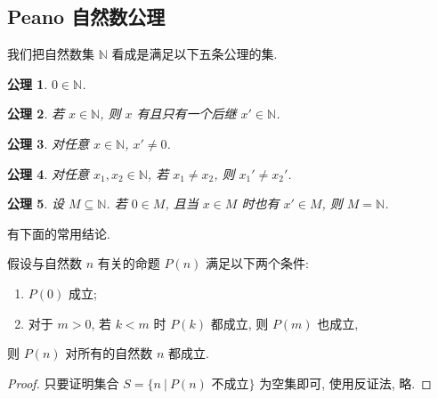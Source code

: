 \documentclass[
    color=black,
    device=normal,
    lang=cn
]{elegantnote}
\newtheorem{axiom}{公理}[section]
\begin{document}
\subsection{Peano 自然数公理}
我们把自然数集 $\mathbb{N}$ 看成是满足以下五条公理的集.
\begin{axiom}
    $0\in\mathbb{N}$.
\end{axiom}
\begin{axiom}
    若 $x\in \mathbb{N}$, 则 $x$ 有且只有一个后继 $x'\in\mathbb{N}$.
\end{axiom}
\begin{axiom}
    对任意 $x\in\mathbb{N}$, $x'\neq0$.
\end{axiom}
\begin{axiom}
    对任意 $x_1,x_2\in \mathbb{N}$, 若 $x_1\neq x_2$, 则 $x_1'\neq x_2'$.
\end{axiom}
\begin{axiom}
    设 $M\subseteq \mathbb{N}$. 若 $0\in M$, 且当 $x\in M$ 时也有 $x'\in M$, 则 $M=\mathbb{N}$.
\end{axiom}
有下面的常用结论.
\begin{theorem}[强归纳法]
    假设与自然数 $n$ 有关的命题 $P(n)$ 满足以下两个条件:
    \begin{enumerate}[label=$\arabic*^\circ$]
        \item $P(0)$ 成立;
        \item 对于 $m>0$, 若 $k<m$ 时 $P(k)$ 都成立, 则 $P(m)$ 也成立,
    \end{enumerate}
    则 $P(n)$ 对所有的自然数 $n$ 都成立.
\end{theorem}
\begin{proof}
    只要证明集合 $S=\{n\ \vert\ P(n)\text{ 不成立}\}$ 为空集即可, 使用反证法, 略.
\end{proof}
\end{document}
